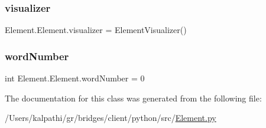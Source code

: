 \hypertarget{class_element_1_1_element_a7a5b8e1891bf065fa81f51a8f6b4212e}{}\label{class_element_1_1_element_a7a5b8e1891bf065fa81f51a8f6b4212e} 
\subsubsection{\texorpdfstring{visualizer}{visualizer}}
{\footnotesize\ttfamily Element.\+Element.\+visualizer = Element\+Visualizer()\hspace{0.3cm}{\ttfamily [static]}}

\hypertarget{class_element_1_1_element_a58cc88e7f79da391e25e4fa98845b8cc}{}\label{class_element_1_1_element_a58cc88e7f79da391e25e4fa98845b8cc} 
\subsubsection{\texorpdfstring{word\+Number}{wordNumber}}
{\footnotesize\ttfamily int Element.\+Element.\+word\+Number = 0\hspace{0.3cm}{\ttfamily [static]}}



The documentation for this class was generated from the following file\+:\begin{DoxyCompactItemize}
\item 
/\+Users/kalpathi/gr/bridges/client/python/src/\hyperlink{_element_8py}{Element.\+py}\end{DoxyCompactItemize}
